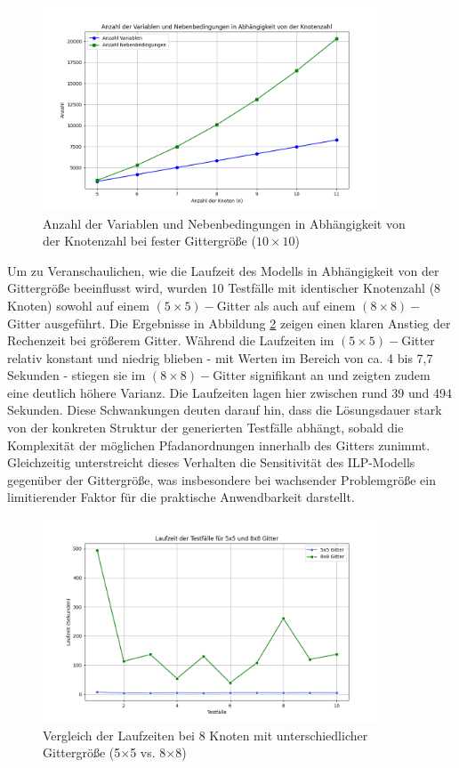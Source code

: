 \documentclass[bachelor, german]{algothesis}
\begin{document}
\begin{figure}[H]
    \centering
    \includegraphics[width=0.9\textwidth]{figures/VariabelConstrains5-11.png}
    \caption{Anzahl der Variablen und Nebenbedingungen in Abhängigkeit von der Knotenzahl bei fester Gittergröße ($10 \times 10$)}
    \label{fig:var_nodes}
\end{figure}
Um zu Veranschaulichen, wie die Laufzeit des Modells in Abhängigkeit von der Gittergröße beeinflusst wird, wurden 10 Testfälle mit identischer Knotenzahl (8 Knoten) sowohl auf einem $(5\times 5)-$Gitter als auch auf einem $(8\times8)-$Gitter ausgeführt. Die Ergebnisse in Abbildung \ref{fig:SekNode8} zeigen einen klaren Anstieg der Rechenzeit bei größerem Gitter. Während die Laufzeiten im $(5\times 5)-$Gitter relativ konstant und niedrig blieben - mit Werten im Bereich von ca. 4 bis 7,7 Sekunden - stiegen sie im $(8\times 8)-$Gitter signifikant an und zeigten zudem eine deutlich höhere Varianz. Die Laufzeiten lagen hier zwischen rund 39 und 494 Sekunden. Diese Schwankungen deuten darauf hin, dass die Lösungsdauer stark von der konkreten Struktur der generierten Testfälle abhängt, sobald die Komplexität der möglichen Pfadanordnungen innerhalb des Gitters zunimmt. Gleichzeitig unterstreicht dieses Verhalten die Sensitivität des ILP-Modells gegenüber der Gittergröße, was insbesondere bei wachsender Problemgröße ein limitierender Faktor für die praktische Anwendbarkeit darstellt. 
\begin{figure}[H]
    \centering
    \includegraphics[width=0.9\textwidth]{figures/Laufzeit8NodesDiffOneY.png}
    \caption{Vergleich der Laufzeiten bei 8 Knoten mit unterschiedlicher Gittergröße (5$\times$5 vs. 8$\times$8)}
    \label{fig:SekNode8}
\end{figure}
\end{document}
